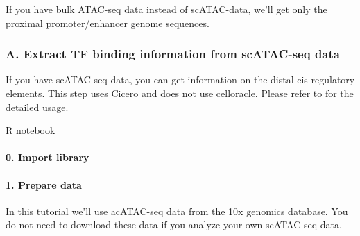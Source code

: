 \documentclass[letterpaper,10pt,english]{sphinxmanual}
\begin{document}
If you have bulk ATAC-seq data instead of scATAC-data, we’ll get only the proximal promoter/enhancer genome sequences.


\subsubsection{A. Extract TF binding information from scATAC-seq data}
\label{\detokenize{tutorials/atac:a-extract-tf-binding-information-from-scatac-seq-data}}
If you have scATAC-seq data, you can get information on the distal cis-regulatory elements.
This step uses Cicero and does not use celloracle. Please refer to  for the detailed usage.

R notebook


\paragraph{0. Import library}
\label{\detokenize{notebooks/01_ATAC-seq_data_processing/option1_scATAC-seq_data_analysis_with_cicero/01_atacdata_to_cicero:0.-Import-library}}\label{\detokenize{notebooks/01_ATAC-seq_data_processing/option1_scATAC-seq_data_analysis_with_cicero/01_atacdata_to_cicero::doc}}
{
\begin{sphinxVerbatim}[commandchars=\\\{\}]
\llap{\color{nbsphinxin}[2]:\,\hspace{\fboxrule}\hspace{\fboxsep}}
\end{sphinxVerbatim}
}


\paragraph{1. Prepare data}
\label{\detokenize{notebooks/01_ATAC-seq_data_processing/option1_scATAC-seq_data_analysis_with_cicero/01_atacdata_to_cicero:1.-Prepare-data}}
In this tutorial we’ll use acATAC-seq data from the 10x genomics database. You do not need to download these data if you analyze your own scATAC-seq data.
\end{document}
